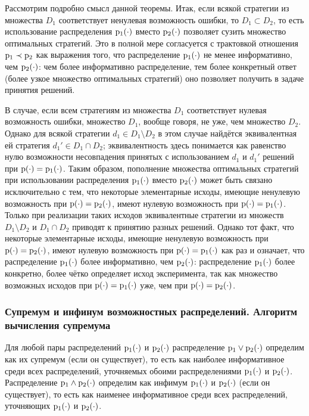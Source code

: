 Рассмотрим подробно смысл данной теоремы. Итак, если всякой стратегии из множества $D_1$ соответствует ненулевая возможность ошибки, то $D_1\subset D_2$, то есть использование распределения ${\mathrm{p}}_1(\cdot)$ вместо ${\mathrm{p}}_2(\cdot)$ позволяет сузить множество оптимальных стратегий. Это в полной мере согласуется с трактовкой отношения ${\mathrm{p}}_1\prec{\mathrm{p}}_2$ как выражения того, что распределение ${\mathrm{p}}_1(\cdot)$ не менее информативно, чем ${\mathrm{p}}_2(\cdot)$: чем более информативно распределение, тем более конкретный ответ (более узкое множество оптимальных стратегий) оно позволяет получить в задаче принятия решений.

В случае, если всем стратегиям из множества $D_1$ соответствует нулевая возможность ошибки,
множество $D_1$, вообще говоря, не уже, чем множество $D_2$.
Однако для всякой стратегии $d_1\in D_1\setminus D_2$ в этом случае найдётся эквивалентная ей стратегия $d_1'\in D_1\cap D_2$; эквивалентность здесь понимается как равенство нулю возможности несовпадения принятых с использованием $d_1$ и $d_1'$ решений при ${\mathrm{p}}(\cdot) = {\mathrm{p}}_1(\cdot)$.
Таким образом, пополнение множества оптимальных стратегий при использовании распределения ${\mathrm{p}}_1(\cdot)$ вместо ${\mathrm{p}}_2(\cdot)$ может быть связано исключительно с тем, что некоторые элементарные исходы, имеющие ненулевую возможность при ${\mathrm{p}}(\cdot) = {\mathrm{p}}_2(\cdot)$, имеют нулевую возможность при ${\mathrm{p}}(\cdot) = {\mathrm{p}}_1(\cdot)$. Только при реализации таких исходов эквивалентные стратегии из множеств $D_1\setminus D_2$ и $D_1\cap D_2$ приводят к принятию разных решений.
Однако тот факт, что некоторые элементарные исходы, имеющие ненулевую возможность при ${\mathrm{p}}(\cdot) = {\mathrm{p}}_2(\cdot)$, имеют нулевую возможность при ${\mathrm{p}}(\cdot) = {\mathrm{p}}_1(\cdot)$ как раз и означает, что распределение ${\mathrm{p}}_1(\cdot)$ более информативно, чем ${\mathrm{p}}_2(\cdot)$: распределение ${\mathrm{p}}_1(\cdot)$ более конкретно, более чётко определяет исход эксперимента, так как множество возможных исходов при ${\mathrm{p}}(\cdot) = {\mathrm{p}}_1(\cdot)$ уже, чем при ${\mathrm{p}}(\cdot) = {\mathrm{p}}_2(\cdot)$.	
	
\subsubsection{Супремум и инфинум возможностных распределений. Алгоритм вычисления супремума}
\label{algo_sup_poss}

Для любой пары распределений ${\mathrm{p}}_1(\cdot)$ и ${\mathrm{p}}_2(\cdot)$ распределение ${\mathrm{p}}_1\vee{\mathrm{p}}_2(\cdot)$ определим как их супремум (если он существует), то есть как наиболее информативное среди всех распределений, уточняемых обоими распределениями ${\mathrm{p}}_1(\cdot)$ и ${\mathrm{p}}_2(\cdot)$. Распределение ${\mathrm{p}}_1\wedge{\mathrm{p}}_2(\cdot)$ определим как инфимум ${\mathrm{p}}_1(\cdot)$ и ${\mathrm{p}}_2(\cdot)$ (если он существует), то есть как наименее информативное среди всех распределений, уточняющих ${\mathrm{p}}_1(\cdot)$ и ${\mathrm{p}}_2(\cdot)$.

